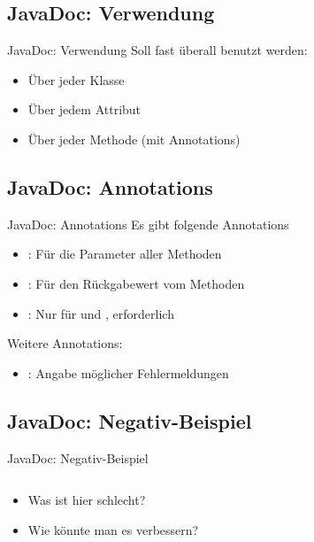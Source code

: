 \documentclass[usepdftitle=false,hyperref={pdfpagelabels=false}]{beamer}
\begin{document}
\subsection{JavaDoc: Verwendung}
\begin{frame}{JavaDoc: Verwendung}
  Soll fast überall benutzt werden:
  \begin{itemize}
    \item Über jeder Klasse
    \item Über jedem Attribut
    \item Über jeder Methode (mit Annotations)
  \end{itemize}
\end{frame}

\subsection{JavaDoc: Annotations}
\begin{frame}{JavaDoc: Annotations}
  Es gibt folgende Annotations
  \begin{itemize}
    \item {}: Für die Parameter aller Methoden
    \item {}: Für den Rückgabewert vom Methoden
    \item {}: Nur für  und , erforderlich
  \end{itemize}
  \vspace{0.5cm}
  Weitere Annotations:
  \begin{itemize}
    \item {}: Angabe möglicher Fehlermeldungen
  \end{itemize}
\end{frame}

\subsection{JavaDoc: Negativ-Beispiel}
\begin{frame}{JavaDoc: Negativ-Beispiel}
  \inputminted[linenos=true, numbersep=5pt, tabsize=4, fontsize=\small, firstline=1, lastline=6]{java}{JavaDoc.java}

  \begin{itemize}
    \item Was ist hier schlecht?
    \item Wie könnte man es verbessern?
  \end{itemize}
\end{frame}
\end{document}
